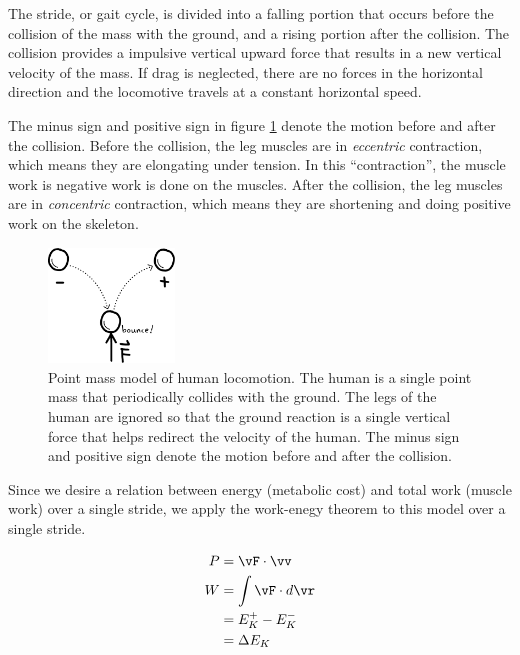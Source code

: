 The stride, or gait cycle, is divided into a falling portion that occurs before the collision of the mass with the ground, and a rising portion after the collision. The collision provides a impulsive vertical upward force that results in a new vertical velocity of the mass. If drag is neglected, there are no forces in the horizontal direction and the locomotive travels at a constant horizontal speed.

The minus sign and positive sign in figure \ref{fig:Bounce} denote the motion before and after the collision. Before the collision, the leg muscles are in \emph{eccentric} contraction, which means they are elongating under tension. In this ``contraction'', the muscle work is negative work is done on the muscles. After the collision, the leg muscles are in \emph{concentric} contraction, which means they are shortening and doing positive work on the skeleton.

\begin{figure}[h]		%
\begin{centering}
\includegraphics[width=0.3\textwidth]{Figures/Bounce}\par
\end{centering}
\caption[Diagram: Point Mass Model of Human Locomotion]{Point mass model of human locomotion. The human is a single point mass that periodically collides with the ground. The legs of the human are ignored so that the ground reaction is a single vertical force that helps redirect the velocity of the human. The minus sign and positive sign denote the motion before and after the collision.}
\label{fig:Bounce}
\end{figure}
%

Since we desire a relation between energy (metabolic cost) and total work (muscle work) over a single stride, we apply the work-enegy theorem to this model over a single stride.

\begin{align}
P &= \vF \cdot \vv \notag \\
W &= \int \vF \cdot d\vr \notag \\
  &= E^{+}_{K} - E^{-}_{K} \notag \\
 &= \Delta E_K
\label{eq:CollisionalWork}
\end{align}

